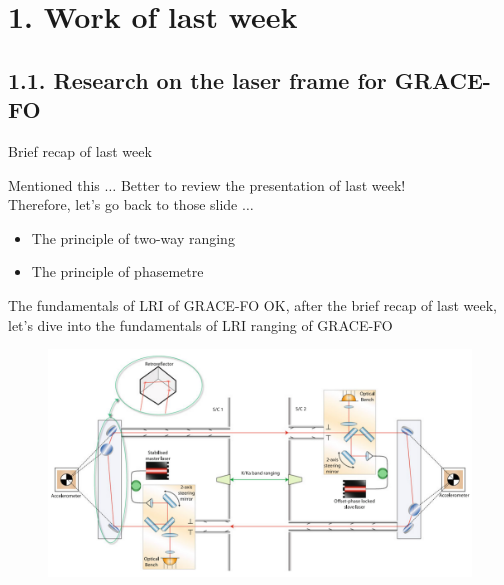 \documentclass[12pt,english,ignorenonframetext,]{beamer}
\providecommand{\tightlist}{%
  \setlength{\itemsep}{0pt}\setlength{\parskip}{0pt}}
\begin{document}
\section{\hfill{}1. Work of last week\hfill{}}

\subsection{\hfill{}1.1. Research on the laser frame for GRACE-FO\hfill{}}


\begin{frame}{Brief recap of last week}
	
	\begin{block}{Mentioned this $\dots$}
		Better to review the presentation of last week! \\
		Therefore, let's go back to those slide $\dots$
	\end{block}

\begin{itemize}
\tightlist
\item
  The principle of two-way ranging
\item
 The principle of phasemetre
\end{itemize}

\end{frame}

\begin{frame}{The fundamentals of LRI of GRACE-FO}
    OK, after the brief recap of last week, let's dive into the fundamentals of LRI ranging of GRACE-FO

    \begin{figure}
		\includegraphics[height=0.7\textheight]{..//images//diagram_grace_fo.png}
    \end{figure}

\end{frame}
\end{document}
